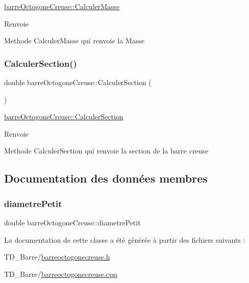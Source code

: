 \hyperlink{classbarre_octogone_creuse_a301de4f326c5e74317f640663f0dffc2}{barre\+Octogone\+Creuse\+::\+Calculer\+Masse} 

\begin{DoxyReturn}{Renvoie}

\end{DoxyReturn}
Methode Calculer\+Masse qui renvoie la Masse \mbox{\label{classbarre_octogone_creuse_a271dcf37a8794ec979ab82f87f99e218}} 
\subsubsection{\texorpdfstring{Calculer\+Section()}{CalculerSection()}}
{\footnotesize\ttfamily double barre\+Octogone\+Creuse\+::\+Calculer\+Section (\begin{DoxyParamCaption}{ }\end{DoxyParamCaption})}



\hyperlink{classbarre_octogone_creuse_a271dcf37a8794ec979ab82f87f99e218}{barre\+Octogone\+Creuse\+::\+Calculer\+Section} 

\begin{DoxyReturn}{Renvoie}

\end{DoxyReturn}
Methode Calculer\+Section qui renvoie la section de la barre creuse 

\subsection{Documentation des données membres}
\mbox{\label{classbarre_octogone_creuse_a6ce90d417e09ed69d6d4243e8bff355a}} 
\subsubsection{\texorpdfstring{diametre\+Petit}{diametrePetit}}
{\footnotesize\ttfamily double barre\+Octogone\+Creuse\+::diametre\+Petit\hspace{0.3cm}{\ttfamily [private]}}



La documentation de cette classe a été générée à partir des fichiers suivants \+:\begin{DoxyCompactItemize}
\item 
T\+D\+\_\+\+Barre/\hyperlink{barreoctogonecreuse_8h}{barreoctogonecreuse.\+h}\item 
T\+D\+\_\+\+Barre/\hyperlink{barreoctogonecreuse_8cpp}{barreoctogonecreuse.\+cpp}\end{DoxyCompactItemize}

